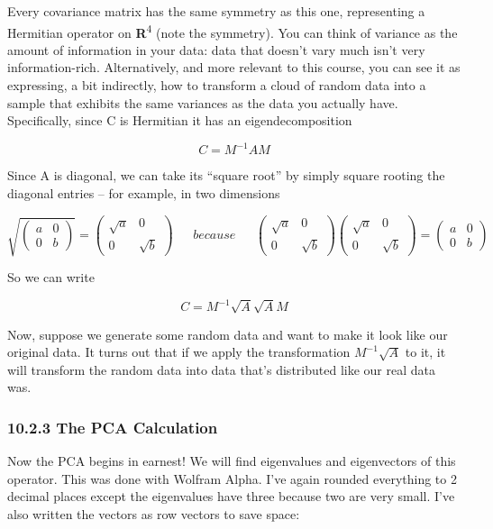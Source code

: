 \documentclass[oneside,english]{amsbook}
\numberwithin{section}{chapter}
\theoremstyle{plain}
\theoremstyle{definition}
\begin{document}
Every covariance matrix has the same symmetry as this one, representing
a Hermitian operator on \textbf{R}\textsuperscript{4} (note the
symmetry). You can think of variance as the amount of information in
your data: data that doesn't vary much isn't very information-rich.
Alternatively, and more relevant to this course, you can see it as
expressing, a bit indirectly, how to transform a cloud of random data
into a sample that exhibits the same variances as the data you actually
have. Specifically, since C is Hermitian it has an eigendecomposition

\[C = M^{- 1}AM\]

Since A is diagonal, we can take its ``square root'' by simply square
rooting the diagonal entries -- for example, in two dimensions

\[\sqrt{\begin{pmatrix}
		a & 0 \\
		0 & b
\end{pmatrix}} = \begin{pmatrix}
	\sqrt{a} & 0 \\
	0 & \sqrt{b}
\end{pmatrix}\ \ \ \ \ \ \ because\ \ \ \ \ \ \ \begin{pmatrix}
	\sqrt{a} & 0 \\
	0 & \sqrt{b}
\end{pmatrix}\begin{pmatrix}
	\sqrt{a} & 0 \\
	0 & \sqrt{b}
\end{pmatrix} = \begin{pmatrix}
	a & 0 \\
	0 & b
\end{pmatrix}\]

So we can write

\[C = M^{- 1}\sqrt{A}\sqrt{A}M\]

Now, suppose we generate some random data and want to make it look like
our original data. It turns out that if we apply the transformation
\(M^{- 1}\sqrt{A}\) to it, it will transform the random data into data
that's distributed like our real data was.

\subsubsection{10.2.3 The PCA Calculation}\label{the-pca-calculation}

Now the PCA begins in earnest! We will find eigenvalues and eigenvectors
of this operator. This was done with Wolfram Alpha. I've again rounded
everything to 2 decimal places except the eigenvalues have three because
two are very small. I've also written the vectors as row vectors to save
space:
\end{document}
